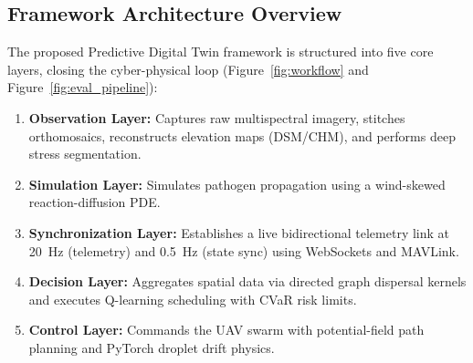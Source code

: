 \documentclass[review,3p,times,authoryear]{elsarticle}
\begin{document}
\subsection{Framework Architecture Overview}
The proposed Predictive Digital Twin framework is structured into five core layers, closing the cyber-physical loop (Figure~\ref{fig:workflow} and Figure~\ref{fig:eval_pipeline}):
\begin{enumerate}
    \item \textbf{Observation Layer:} Captures raw multispectral imagery, stitches orthomosaics, reconstructs elevation maps (DSM/CHM), and performs deep stress segmentation.
    \item \textbf{Simulation Layer:} Simulates pathogen propagation using a wind-skewed reaction-diffusion PDE.
    \item \textbf{Synchronization Layer:} Establishes a live bidirectional telemetry link at 20~Hz (telemetry) and 0.5~Hz (state sync) using WebSockets and MAVLink.
    \item \textbf{Decision Layer:} Aggregates spatial data via directed graph dispersal kernels and executes Q-learning scheduling with CVaR risk limits.
    \item \textbf{Control Layer:} Commands the UAV swarm with potential-field path planning and PyTorch droplet drift physics.
\end{enumerate}
\end{document}
